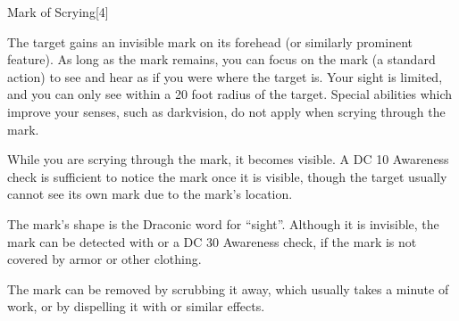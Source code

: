 \begin{spellsection}{Mark of Scrying}[4]
    \begin{spellheader}
    \end{spellheader}
    \begin{spellcontent}
        \begin{spelltargetinginfo}
        \end{spelltargetinginfo}
        \begin{spelleffects}
            \spelleffect The target gains an invisible mark on its forehead (or similarly prominent feature).
            As long as the mark remains, you can focus on the mark (a standard action) to see and hear as if you were where the target is.
            Your sight is limited, and you can only see within a 20 foot radius of the target.
            Special abilities which improve your senses, such as darkvision, do not apply when scrying through the mark.

            While you are scrying through the mark, it becomes visible.
            A DC 10 Awareness check is sufficient to notice the mark once it is visible, though the target usually cannot see its own mark due to the mark's location.
            \spelldur \durlong
        \end{spelleffects}
    \end{spellcontent}
    \begin{spellfooter}
        \spellnotes The mark's shape is the Draconic word for ``sight''.
        Although it is invisible, the mark can be detected with  or a DC 30 Awareness check, if the mark is not covered by armor or other clothing.

        The mark can be removed by scrubbing it away, which usually takes a minute of work, or by dispelling it with  or similar effects.
        \miscastrandom
    \end{spellfooter}
\end{spellsection}

